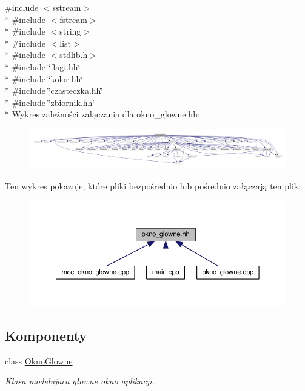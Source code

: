 {\ttfamily \#include $<$sstream$>$}\\*
{\ttfamily \#include $<$fstream$>$}\\*
{\ttfamily \#include $<$string$>$}\\*
{\ttfamily \#include $<$list$>$}\\*
{\ttfamily \#include $<$stdlib.\-h$>$}\\*
{\ttfamily \#include \char`\"{}flagi.\-hh\char`\"{}}\\*
{\ttfamily \#include \char`\"{}kolor.\-hh\char`\"{}}\\*
{\ttfamily \#include \char`\"{}czasteczka.\-hh\char`\"{}}\\*
{\ttfamily \#include \char`\"{}zbiornik.\-hh\char`\"{}}\\*
Wykres zależności załączania dla okno\-\_\-glowne.\-hh\-:\nopagebreak
\begin{figure}[H]
\begin{center}
\leavevmode
\includegraphics[width=350pt]{okno__glowne_8hh__incl}
\end{center}
\end{figure}
Ten wykres pokazuje, które pliki bezpośrednio lub pośrednio załączają ten plik\-:\nopagebreak
\begin{figure}[H]
\begin{center}
\leavevmode
\includegraphics[width=350pt]{okno__glowne_8hh__dep__incl}
\end{center}
\end{figure}
\subsection*{Komponenty}
\begin{DoxyCompactItemize}
\item 
class \hyperlink{class_okno_glowne}{Okno\-Glowne}
\begin{DoxyCompactList}\small\item\em Klasa modelujaca głowne okno aplikacji. \end{DoxyCompactList}\end{DoxyCompactItemize}


